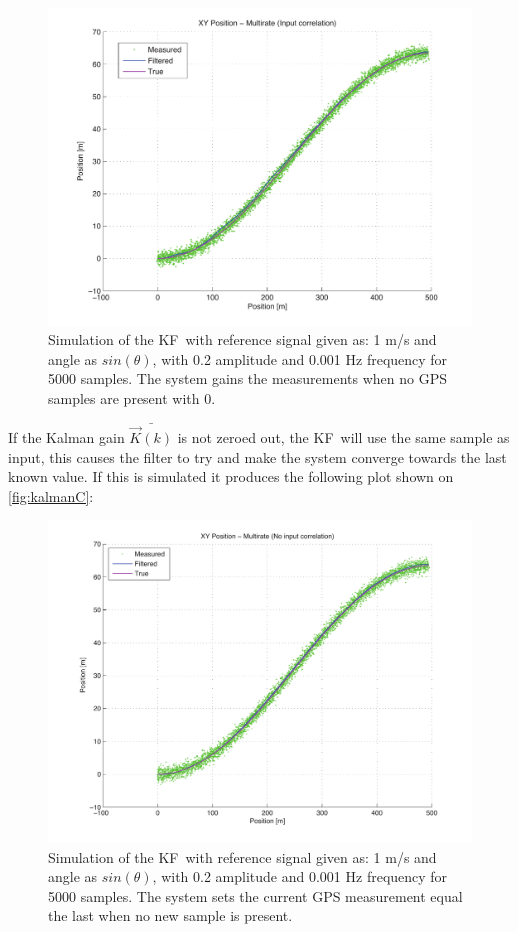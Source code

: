\begin{figure}[htbp]
	\centering
	\includegraphics[width=\textwidth]{img/kalmanb}
	\caption{Simulation of the \ac{KF} with reference signal given as: 1 m/s and angle as $sin(\theta)$, with 0.2 amplitude and 0.001 Hz frequency for 5000 samples. The system gains the measurements when no \ac{GPS} samples are present with 0.}
	\label{fig:kalmanB}
\end{figure}

If the Kalman gain $\bar{\vec{K}(k)}$ is not zeroed out, the \ac{KF} will use the same sample as input, this causes the filter to try and make the system converge towards the last known value. If this is simulated it produces the following plot shown on \vref{fig:kalmanC}:

\begin{figure}[htbp]
	\centering
	\includegraphics[width=\textwidth]{img/kalmanc}
	\caption{Simulation of the \ac{KF} with reference signal given as: 1 m/s and angle as $sin(\theta)$, with 0.2 amplitude and 0.001 Hz frequency for 5000 samples. The system sets the current \ac{GPS} measurement equal the last when no new sample is present.}
	\label{fig:kalmanC}
\end{figure}

